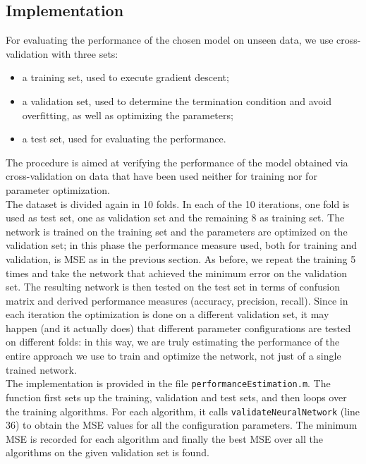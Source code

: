 \documentclass{article}
\begin{document}
\subsection{Implementation}
For evaluating the performance of the chosen model on unseen data, we use cross-validation with three sets:
\begin{itemize}
	\item a training set, used to execute gradient descent;
	\item a validation set, used to determine the termination condition and avoid overfitting, as well as optimizing the parameters;
	\item a test set, used for evaluating the performance.
\end{itemize}
The procedure is aimed at verifying the performance of the model obtained via cross-validation on data that have been used neither for training nor for parameter optimization.\\
The dataset is divided again in 10 folds. In each of the 10 iterations, one fold is used as test set, one as validation set and the remaining 8 as training set. The network is trained on the training set and the parameters are optimized on the validation set; in this phase the performance measure used, both for training and validation, is MSE as in the previous section. As before, we repeat the training 5 times and take the network that achieved the minimum error on the validation set. The resulting network is then tested on the test set in terms of confusion matrix and derived performance measures (accuracy, precision, recall). Since in each iteration the optimization is done on a different validation set, it may happen (and it actually does) that different parameter configurations are tested on different folds: in this way, we are truly estimating the performance of the entire approach we use to train and optimize the network, not just of a single trained network.\\
The implementation is provided in the file \verb$performanceEstimation.m$. The function first sets up the training, validation and test sets, and then loops over the training algorithms. For each algorithm, it calls \verb$validateNeuralNetwork$ (line 36) to obtain the MSE values for all the configuration parameters. The minimum MSE is recorded for each algorithm and finally the best MSE over all the algorithms on the given validation set is found.\\
\end{document}
